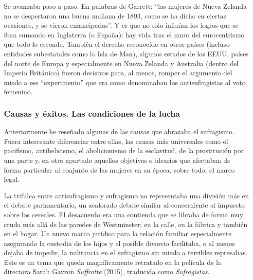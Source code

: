 \documentclass[
]{article}
\begin{document}
Se avanzaba paso a paso. En palabras de Garrett: ``las mujeres de Nueva
Zelanda no se despertaron una buena mañana de 1893, como se ha dicho en
ciertas ocasiones, y se vieron emancipadas''. Y es que no solo influían
los logros que se iban sumando en Inglaterra (o España): hay vida tras
el muro del eurocentrismo que todo lo esconde. También el derecho
reconocido en otros países (incluso entidades subestatales como la Isla
de Man), algunos estados de los EEUU, países del norte de Europa y
especialmente en Nueva Zelanda y Australia (dentro del Imperio
Británico) fueron decisivos para, al menos, romper el argumento del
miedo a ese ``experimento'' que era como denominaban los antisufragistas
al voto femenino.

\hypertarget{causas-y-uxe9xitos.-las-condiciones-de-la-lucha}{%
\subsubsection{Causas y éxitos. Las condiciones de la
lucha}\label{causas-y-uxe9xitos.-las-condiciones-de-la-lucha}}

Anteriormente he reseñado algunas de las causas que abrazaba el
sufragismo. Fuera interesante diferenciar entre ellas, las causas más
universales como el pacifismo, antibelicismo, el abolicionismo de la
esclavitud, de la prostitución por una parte y, en otro apartado
aquellos objetivos o idearios que afectaban de forma particular al
conjunto de las mujeres en su época, sobre todo, el marco legal.

La trifulca entre antisufragismo y sufragismo no representaba una
división más en el debate parlamentario, un acalorado debate similar al
concerniente al impuesto sobre los cereales. El desacuerdo era una
contienda que se libraba de forma muy cruda más allá de las paredes de
Westminster; en la calle, en la fábrica y también en el hogar. Un nuevo
marco jurídico para la relación familiar especialmente asegurando la
custodia de los hijos y el posible divorcio facilitaba, o al menos
dejaba de impedir, la militancia en el sufragismo sin miedo a terribles
represalias. Este es un tema que queda magníficamente retratado en la
película de la directora Sarah Gavron \emph{Suffratte} (2015), traducida
como \emph{Sufragistas}.
\end{document}
